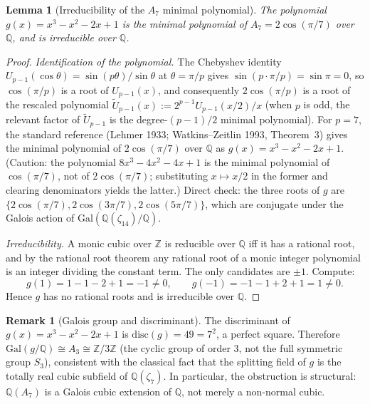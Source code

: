 \documentclass[11pt,reqno]{amsart}
\theoremstyle{plain}
\newtheorem{lemma}[theorem]{Lemma}
\theoremstyle{definition}
\newtheorem{remark}[theorem]{Remark}
\newcommand{\Z}{\mathbb{Z}}
\newcommand{\Q}{\mathbb{Q}}
\newcommand{\disc}{\mathrm{disc}}
\begin{document}
\begin{lemma}[Irreducibility of the $A_7$ minimal polynomial] \label{lem:A7-irreducible}
The polynomial $g(x) = x^{3} - x^{2} - 2x + 1$ is the minimal polynomial of $A_7 = 2\cos(\pi/7)$ over $\Q$, and is irreducible over $\Q$.
\end{lemma}

\begin{proof}
\emph{Identification of the polynomial.} The Chebyshev identity $U_{p-1}(\cos\theta) = \sin(p\theta) / \sin\theta$ at $\theta = \pi/p$ gives $\sin(p \cdot \pi/p) = \sin\pi = 0$, so $\cos(\pi/p)$ is a root of $U_{p-1}(x)$, and consequently $2\cos(\pi/p)$ is a root of the rescaled polynomial $\widetilde{U}_{p-1}(x) := 2^{p-1} U_{p-1}(x/2) / x$ (when $p$ is odd, the relevant factor of $\widetilde{U}_{p-1}$ is the degree-$(p-1)/2$ minimal polynomial). For $p = 7$, the standard reference (Lehmer 1933; Watkins--Zeitlin 1993, Theorem~3) gives the minimal polynomial of $2\cos(\pi/7)$ over $\Q$ as $g(x) = x^{3} - x^{2} - 2x + 1$. (Caution: the polynomial $8x^{3} - 4x^{2} - 4x + 1$ is the minimal polynomial of $\cos(\pi/7)$, not of $2\cos(\pi/7)$; substituting $x \mapsto x/2$ in the former and clearing denominators yields the latter.) Direct check: the three roots of $g$ are $\{2\cos(\pi/7), 2\cos(3\pi/7), 2\cos(5\pi/7)\}$, which are conjugate under the Galois action of $\mathrm{Gal}(\Q(\zeta_{14})/\Q)$.

\emph{Irreducibility.} A monic cubic over $\Z$ is reducible over $\Q$ iff it has a rational root, and by the rational root theorem any rational root of a monic integer polynomial is an integer dividing the constant term. The only candidates are $\pm 1$. Compute:
\[
g(1) = 1 - 1 - 2 + 1 = -1 \neq 0, \qquad g(-1) = -1 - 1 + 2 + 1 = 1 \neq 0.
\]
Hence $g$ has no rational roots and is irreducible over $\Q$.
\end{proof}

\begin{remark}[Galois group and discriminant]
The discriminant of $g(x) = x^{3} - x^{2} - 2x + 1$ is $\disc(g) = 49 = 7^{2}$, a perfect square. Therefore $\mathrm{Gal}(g/\Q) \cong A_{3} \cong \Z/3\Z$ (the cyclic group of order $3$, not the full symmetric group $S_3$), consistent with the classical fact that the splitting field of $g$ is the totally real cubic subfield of $\Q(\zeta_{7})$. In particular, the obstruction is structural: $\Q(A_{7})$ is a Galois cubic extension of $\Q$, not merely a non-normal cubic.
\end{remark}
\end{document}
